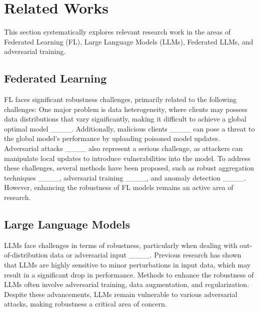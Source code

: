 \section{Related Works}
\label{sec2}
This section systematically explores relevant research work in the areas of Federated Learning (FL), Large Language Models (LLMs), Federated LLMs, and adversarial training.

\subsection{Federated Learning}



FL faces significant robustness challenges, primarily related to the following challenges: One major problem is data heterogeneity, where clients may possess data distributions that vary significantly, making it difficult to achieve a global optimal model ____. Additionally, malicious clients ____ can pose a threat to the global model’s performance by uploading poisoned model updates. Adversarial attacks ____ also represent a serious challenge, as attackers can manipulate local updates to introduce vulnerabilities into the model. To address these challenges, several methods have been proposed, such as robust aggregation techniques ____, adversarial training ____, and anomaly detection ____. However, enhancing the robustness of FL models remains an active area of research.

\subsection{Large Language Models}

LLMs face challenges in terms of robustness, particularly when dealing with out-of-distribution data or adversarial input ____. Previous research has shown that LLMs are highly sensitive to minor perturbations in input data, which may result in a significant drop in performance. Methods to enhance the robustness of LLMs often involve adversarial training, data augmentation, and regularization. Despite these advancements, LLMs remain vulnerable to various adversarial attacks, making robustness a critical area of concern.

